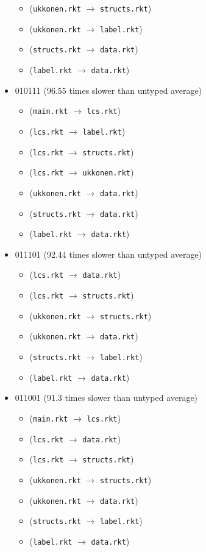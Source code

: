 \documentclass{article}
\newcommand{\mono}[1]{\texttt{#1}}
\begin{document}
\begin{itemize}
\begin{itemize}
  \item (\mono{ukkonen.rkt} $\rightarrow$ \mono{structs.rkt})
  \item (\mono{ukkonen.rkt} $\rightarrow$ \mono{label.rkt})
  \item (\mono{structs.rkt} $\rightarrow$ \mono{data.rkt})
  \item (\mono{label.rkt} $\rightarrow$ \mono{data.rkt})
  \end{itemize}
\item 010111 (96.55 times slower than untyped average)
  \begin{itemize}
  \item (\mono{main.rkt} $\rightarrow$ \mono{lcs.rkt})
  \item (\mono{lcs.rkt} $\rightarrow$ \mono{label.rkt})
  \item (\mono{lcs.rkt} $\rightarrow$ \mono{structs.rkt})
  \item (\mono{lcs.rkt} $\rightarrow$ \mono{ukkonen.rkt})
  \item (\mono{ukkonen.rkt} $\rightarrow$ \mono{data.rkt})
  \item (\mono{structs.rkt} $\rightarrow$ \mono{data.rkt})
  \item (\mono{label.rkt} $\rightarrow$ \mono{data.rkt})
  \end{itemize}
\item 011101 (92.44 times slower than untyped average)
  \begin{itemize}
  \item (\mono{lcs.rkt} $\rightarrow$ \mono{data.rkt})
  \item (\mono{lcs.rkt} $\rightarrow$ \mono{structs.rkt})
  \item (\mono{ukkonen.rkt} $\rightarrow$ \mono{structs.rkt})
  \item (\mono{ukkonen.rkt} $\rightarrow$ \mono{data.rkt})
  \item (\mono{structs.rkt} $\rightarrow$ \mono{label.rkt})
  \item (\mono{label.rkt} $\rightarrow$ \mono{data.rkt})
  \end{itemize}
\item 011001 (91.3 times slower than untyped average)
  \begin{itemize}
  \item (\mono{main.rkt} $\rightarrow$ \mono{lcs.rkt})
  \item (\mono{lcs.rkt} $\rightarrow$ \mono{data.rkt})
  \item (\mono{lcs.rkt} $\rightarrow$ \mono{structs.rkt})
  \item (\mono{ukkonen.rkt} $\rightarrow$ \mono{structs.rkt})
  \item (\mono{ukkonen.rkt} $\rightarrow$ \mono{data.rkt})
  \item (\mono{structs.rkt} $\rightarrow$ \mono{label.rkt})
  \item (\mono{label.rkt} $\rightarrow$ \mono{data.rkt})
  \end{itemize}


\end{itemize}
\end{document}
